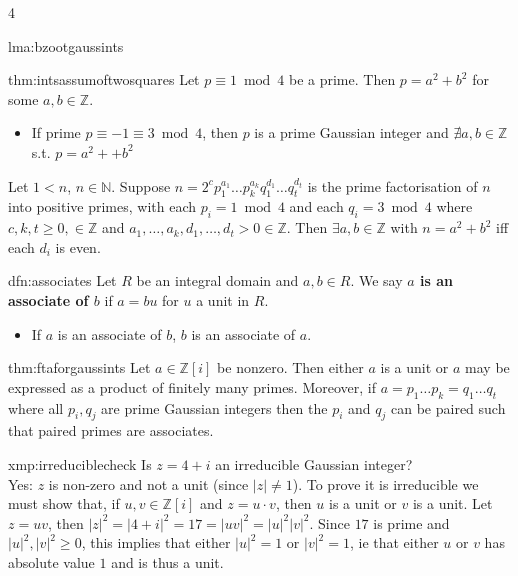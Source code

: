 \documentclass[landscape, 8pt]{extarticle}
\begin{document}
\begin{multicols*}{4}
\begin{lma}{lma:bzootgaussints}{ }
		\end{lma}
		
		
		\begin{thm}{thm:intsassumoftwosquares}{ }
			Let $p \equiv 1 \bmod{4}$ be a prime. Then $p=a^2 + b^2$ for some $a, b\in \mathbb{Z}$.
			\begin{itemize}
				\item If prime $p \equiv -1 \equiv 3 \bmod{4}$, then $p$ is a prime Gaussian integer and $\nexists a, b\in \mathbb{Z}$ s.t. $p = a^2++b^2$
			\end{itemize}
			Let $1 < n$, $n\in \mathbb{N}$. Suppose $n = 2^c p_1^{a_1}\dotsc p_k^{a_k}q_1^{d_1} \dotsc q_t^{d_t}$ is the prime factorisation of $n$ into positive primes, with each $p_i = 1 \bmod{4}$ and each $q_i = 3\bmod{4}$ where $c, k , t \ge 0, \in \mathbb{Z}$ and $a_1, \dots, a_k, d_1, \dots, d_t >0\in \mathbb{Z}$. Then $\exists a, b\in \mathbb{Z}$ with $n = a^2 + b^2$ iff each $d_i$ is even.
			
		\end{thm}
		
		
		\begin{dfn}{dfn:associates}{ }
			Let $R$ be an integral domain and $a, b\in R$. We say \textbf{$a$ is an associate of $b$} if $a = bu$ for $u$ a unit in $R$.
			\begin{itemize}
				\item If $a$ is an associate of $b$, $b$ is an associate of $a$.
			\end{itemize}
			
		\end{dfn}
		
		
		\begin{thm}{thm:ftaforgaussints}{ }
			Let $a\in \mathbb{Z}[i]$ be nonzero. Then either $a$ is a unit or $a$ may be expressed as a product of finitely many primes. Moreover, if $a = p_1 \dotsc p_k = q_1 \dotsc q_t$ where all $p_i, q_j$ are prime Gaussian integers then the $p_i$ and $q_j$ can be paired such that paired primes are associates.
			
		\end{thm}
		
		
		\begin{xmp}{xmp:irreduciblecheck}{ }
			Is $z = 4 + i$ an irreducible Gaussian integer?\\
			Yes: $z$ is non-zero and not a unit (since $\left|z\right|\ne 1$). To prove it is irreducible we must show that, if $u, v\in \mathbb{Z}[i]$ and $z = u\cdot v$, then $u$ is a unit or $v$ is a unit. Let $z = uv$, then $\left|z\right|^2 = \left|4+i\right|^2 = 17 = \left|uv\right|^2 = \left|u\right|^2 \left|v\right|^2$. Since $17$ is prime and $\left|u\right|^2, \left|v\right|^2 \ge 0$, this implies that either $\left|u\right|^2 = 1$ or $\left|v\right|^2 = 1$, ie that either $u$ or $v$ has absolute value $1$ and is thus a unit.
			

\end{xmp}
\end{multicols*}
\end{document}
